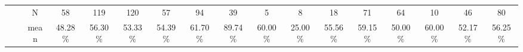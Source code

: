 \documentclass{sigchi}
\begin{document}
\begin{table}[t]
\begin{adjustbox}{width=1\textwidth}
\begin{tabular}{ccccccccccccccccc}
			\multicolumn{1}{|c|}{}                               & \multicolumn{1}{c|}{}                        & \multicolumn{1}{c|}{N}     & \multicolumn{1}{c|}{58}                                   & \multicolumn{1}{c|}{119}                                 & \multicolumn{1}{c|}{120}                                  & \multicolumn{1}{c|}{57}                                  & \multicolumn{1}{c|}{\cellcolor[HTML]{ACDDAA}94}                & \multicolumn{1}{c|}{\cellcolor[HTML]{ACDDAA}39}             & \multicolumn{1}{c|}{5}                                & \multicolumn{1}{c|}{8}                               & \multicolumn{1}{c|}{18}                              & \multicolumn{1}{c|}{71}                              & \multicolumn{1}{c|}{64}                              & \multicolumn{1}{c|}{10}                              & \multicolumn{1}{c|}{46}                                   & \multicolumn{1}{c|}{80}                                  \\ \cline{3-17} 
			\multicolumn{1}{|c|}{}                               & \multicolumn{1}{c|}{}                        & \multicolumn{1}{c|}{mean}  & \multicolumn{1}{c|}{48.28\%}                              & \multicolumn{1}{c|}{56.30\%}                             & \multicolumn{1}{c|}{53.33\%}                              & \multicolumn{1}{c|}{54.39\%}                             & \multicolumn{1}{c|}{\cellcolor[HTML]{ACDDAA}61.70\%}           & \multicolumn{1}{c|}{\cellcolor[HTML]{ACDDAA}89.74\%}        & \multicolumn{1}{c|}{60.00\%}                          & \multicolumn{1}{c|}{25.00\%}                         & \multicolumn{1}{c|}{55.56\%}                         & \multicolumn{1}{c|}{59.15\%}                         & \multicolumn{1}{c|}{50.00\%}                         & \multicolumn{1}{c|}{60.00\%}                         & \multicolumn{1}{c|}{52.17\%}                              & \multicolumn{1}{c|}{56.25\%}                             \\ \cline{3-17} 

\end{tabular}
\end{adjustbox}
\end{table}
\end{document}
